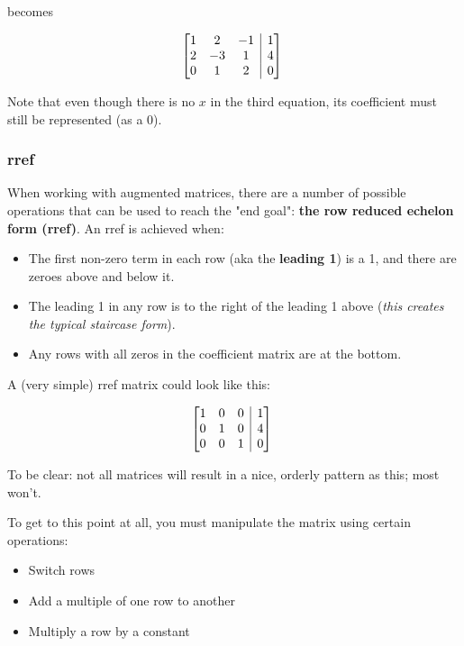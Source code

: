 \documentclass[12pt]{article}
\begin{document}
becomes

\[
    \begin{array}[t][{@{}ccc|c@{}}]
     1 & 2 & -1 & 1 \\
     2 & -3 & 1 & 4 \\
     0 & 1 & 2 & 0 \\
    \end{array}\
\]

Note that even though there is no $x$ in the third equation, its coefficient must still be represented (as a 0).

\subsubsection{rref}
When working with augmented matrices, there are a number of possible operations that can be used to reach the "end goal": \textbf{the row reduced echelon form (rref)}. An rref is achieved when:

\begin{itemize}
    \item The first non-zero term in each row (aka the \textbf{leading 1}) is a 1, and there are zeroes above and below it.
    \item The leading 1 in any row is to the right of the leading 1 above (\textit{this creates the typical staircase form}).
    \item Any rows with all zeros in the coefficient matrix are at the bottom.
\end{itemize}

A (very simple) rref matrix could look like this:

\[
    \begin{array}[t][{@{}ccc|c@{}}]
     1 & 0 & 0 & 1 \\
     0 & 1 & 0 & 4 \\
     0 & 0 & 1 & 0 \\
    \end{array}\
\]

To be clear: not all matrices will result in a nice, orderly pattern as this; most won't.

To get to this point at all, you must manipulate the matrix using certain operations:

\begin{itemize}
    \item Switch rows
    \item Add a multiple of one row to another
    \item Multiply a row by a constant
\end{itemize}
\end{document}
